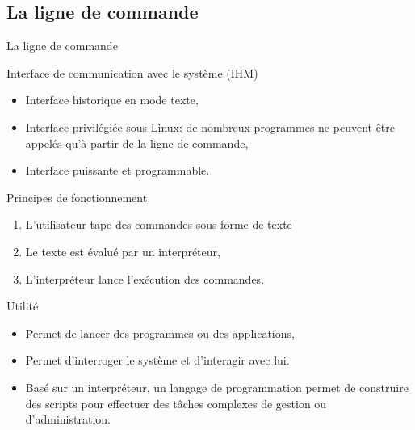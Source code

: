 \subsection{La ligne de commande}
\begin{frame}{La ligne de commande}
  \begin{block}{Interface de communication avec le système (IHM)}
    \begin{itemize}
    \item Interface historique en mode texte,
    \item Interface privilégiée sous Linux: de nombreux programmes ne peuvent être appelés qu'à partir de la ligne de commande,
    \item Interface puissante et programmable. 
    \end{itemize}
  \end{block}
  \begin{block}{Principes de fonctionnement}
    \begin{enumerate}
    \item L'utilisateur tape des commandes sous forme de texte
    \item Le texte est évalué par un interpréteur,
    \item L'interpréteur lance l'exécution des commandes.
    \end{enumerate}
  \end{block}
  \begin{block}{Utilité}
    \begin{itemize}
    \item Permet de lancer des programmes ou des applications,
    \item Permet d'interroger le système et d'interagir avec lui.
    \item Basé sur un interpréteur, un langage de programmation permet de construire des scripts pour effectuer des tâches complexes de gestion ou d'administration.
    \end{itemize}
  \end{block}
\end{frame}
